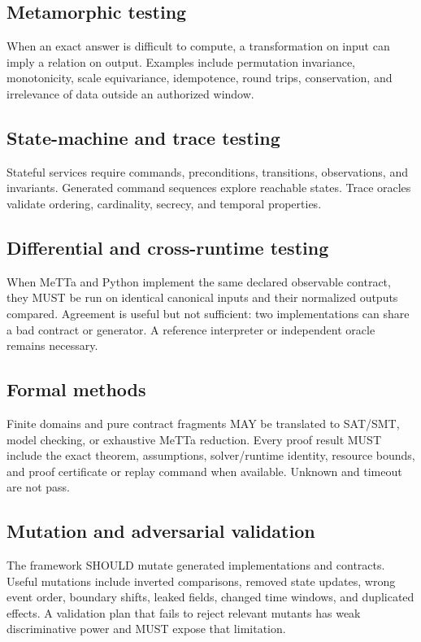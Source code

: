 \documentclass[10pt]{article}
\begin{document}
\subsection{Metamorphic testing}

When an exact answer is difficult to compute, a transformation on input can
imply a relation on output.  Examples include permutation invariance,
monotonicity, scale equivariance, idempotence, round trips, conservation, and
irrelevance of data outside an authorized window.

\subsection{State-machine and trace testing}

Stateful services require commands, preconditions, transitions, observations,
and invariants.  Generated command sequences explore reachable states.  Trace
oracles validate ordering, cardinality, secrecy, and temporal properties.

\subsection{Differential and cross-runtime testing}

When MeTTa and Python implement the same declared observable contract, they
MUST be run on identical canonical inputs and their normalized outputs compared.
Agreement is useful but not sufficient: two implementations can share a bad
contract or generator.  A reference interpreter or independent oracle remains
necessary.

\subsection{Formal methods}

Finite domains and pure contract fragments MAY be translated to SAT/SMT,
model checking, or exhaustive MeTTa reduction.  Every proof result MUST include
the exact theorem, assumptions, solver/runtime identity, resource bounds, and
proof certificate or replay command when available.  Unknown and timeout are
not pass.

\subsection{Mutation and adversarial validation}

The framework SHOULD mutate generated implementations and contracts.  Useful
mutations include inverted comparisons, removed state updates, wrong event
order, boundary shifts, leaked fields, changed time windows, and duplicated
effects.  A validation plan that fails to reject relevant mutants has weak
discriminative power and MUST expose that limitation.
\end{document}
